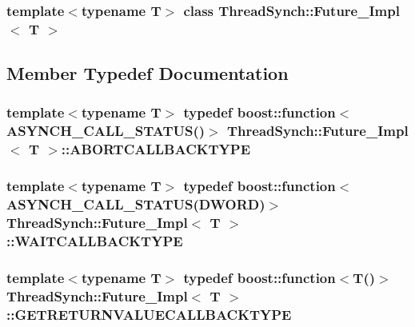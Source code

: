 \subsubsection*{template$<$typename T$>$ class Thread\-Synch::Future\_\-Impl$<$ T $>$}



\subsection{Member Typedef Documentation}
\subsubsection{\setlength{\rightskip}{0pt plus 5cm}template$<$typename T$>$ typedef boost::function$<${\bf ASYNCH\_\-CALL\_\-STATUS}()$>$ {\bf Thread\-Synch::Future\_\-Impl}$<$ T $>$::{\bf ABORTCALLBACKTYPE}}\label{class_thread_synch_1_1_future___impl_abae03c6058f98c0d90645a1eed44d2c}


\subsubsection{\setlength{\rightskip}{0pt plus 5cm}template$<$typename T$>$ typedef boost::function$<${\bf ASYNCH\_\-CALL\_\-STATUS}(DWORD)$>$ {\bf Thread\-Synch::Future\_\-Impl}$<$ T $>$::{\bf WAITCALLBACKTYPE}}\label{class_thread_synch_1_1_future___impl_dfe894288e72ab06cbc2daa0e86a3f20}


\subsubsection{\setlength{\rightskip}{0pt plus 5cm}template$<$typename T$>$ typedef boost::function$<$T()$>$ {\bf Thread\-Synch::Future\_\-Impl}$<$ T $>$::{\bf GETRETURNVALUECALLBACKTYPE}}\label{class_thread_synch_1_1_future___impl_75b386ddaa4b00faf958454aec405c53}




